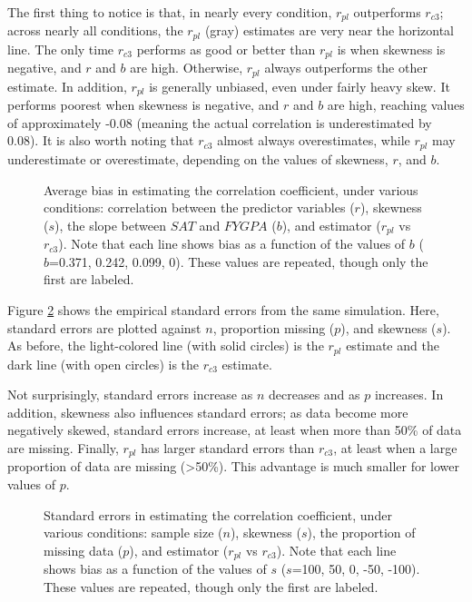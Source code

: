 \documentclass[english,man]{apa6}
\theoremstyle{definition}
\theoremstyle{definition}
\theoremstyle{remark}
\begin{document}
The first thing to notice is that, in nearly every condition, \(r_{pl}\)
outperforms \(r_{c3}\); across nearly all conditions, the \(r_{pl}\)
(gray) estimates are very near the horizontal line. The only time
\(r_{c3}\) performs as good or better than \(r_{pl}\) is when skewness
is negative, and \(r\) and \(b\) are high. Otherwise, \(r_{pl}\) always
outperforms the other estimate. In addition, \(r_{pl}\) is generally
unbiased, even under fairly heavy skew. It performs poorest when
skewness is negative, and \(r\) and \(b\) are high, reaching values of
approximately -0.08 (meaning the actual correlation is underestimated by
0.08). It is also worth noting that \(r_{c3}\) almost always
overestimates, while \(r_{pl}\) may underestimate or overestimate,
depending on the values of skewness, \(r\), and \(b\).

\begin{figure}[htbp]
\begin{center}
\caption{Average bias in estimating the correlation coefficient, under various conditions: correlation between the predictor variables ($r$), skewness ($s$), the slope between $SAT$ and $FYGPA$ ($b$), and estimator ($r_{pl}$ vs $r_{c3}$). Note that each line shows bias as a function of the values of $b$ ($b$=0.371, 0.242, 0.099, 0). These values are repeated, though only the first are labeled.}
\label{fig:results}
\end{center}
\end{figure}

Figure \ref{fig:se} shows the empirical standard errors from the same
simulation. Here, standard errors are plotted against \(n\), proportion
missing (\(p\)), and skewness (\(s\)). As before, the light-colored line
(with solid circles) is the \(r_{pl}\) estimate and the dark line (with
open circles) is the \(r_{c3}\) estimate.

Not surprisingly, standard errors increase as \(n\) decreases and as
\(p\) increases. In addition, skewness also influences standard errors;
as data become more negatively skewed, standard errors increase, at
least when more than 50\% of data are missing. Finally, \(r_{pl}\) has
larger standard errors than \(r_{c3}\), at least when a large proportion
of data are missing (\textgreater{}50\%). This advantage is much smaller
for lower values of \(p\).

\begin{figure}[htbp]
\begin{center}
\caption{Standard errors in estimating the correlation coefficient, under various conditions: sample size ($n$), skewness ($s$), the proportion of missing data ($p$), and estimator ($r_{pl}$ vs $r_{c3}$). Note that each line shows bias as a function of the values of $s$ ($s$=100, 50, 0, -50, -100). These values are repeated, though only the first are labeled.}
\label{fig:se}
\end{center}
\end{figure}
\end{document}
